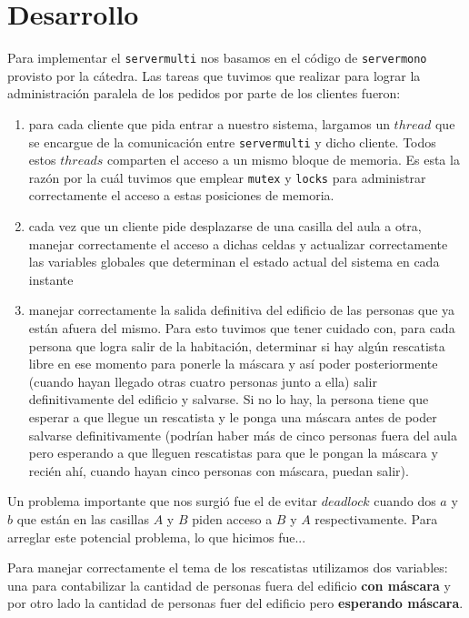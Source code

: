 \documentclass[11pt, a4paper, twoside]{article}
\begin{document}
\section{Desarrollo}
Para implementar el \texttt{servermulti} nos basamos en el código de \texttt{servermono} provisto por la
cátedra. Las tareas que tuvimos que realizar para lograr la administración paralela de los pedidos por
parte de los clientes fueron:
\begin{enumerate}
\item para cada cliente que pida entrar a nuestro sistema, largamos un $thread$ que se encargue de la
  comunicación entre \texttt{servermulti} y dicho cliente. Todos estos $threads$ comparten el acceso a un
  mismo bloque de memoria. Es esta la razón por la cuál tuvimos que emplear \texttt{mutex} y \texttt{locks}
  para administrar correctamente el acceso a estas posiciones de memoria.
\item cada vez que un cliente pide desplazarse de una casilla del aula a otra, manejar correctamente el
  acceso a dichas celdas y actualizar correctamente las variables globales que determinan el estado actual
  del sistema en cada instante
\item manejar correctamente la salida definitiva del edificio de las personas que ya están afuera del mismo.
  Para esto tuvimos que tener cuidado con,  para cada persona que logra salir de la habitación, determinar
  si hay algún rescatista libre en ese momento para ponerle la máscara y así poder posteriormente (cuando
  hayan llegado otras cuatro personas junto a ella) salir definitivamente del edificio y salvarse. Si no lo
  hay, la persona tiene que esperar a que llegue un rescatista y le ponga una máscara antes de poder salvarse
  definitivamente (podrían haber más de cinco personas fuera del aula pero esperando a que lleguen rescatistas
  para que le pongan la máscara y recién ahí, cuando hayan cinco personas con máscara, puedan salir).

\end{enumerate}

\par Un problema importante que nos surgió fue el de evitar $deadlock$ cuando dos $a$ y $b$ que están en las
casillas $A$ y $B$ piden acceso a $B$ y $A$ respectivamente. Para arreglar este potencial problema, lo que
hicimos fue...

\par Para manejar correctamente el tema de los rescatistas utilizamos dos variables: una para contabilizar
la cantidad de personas fuera del edificio \textbf{con máscara} y por otro lado la cantidad de personas
fuer del edificio pero \textbf{esperando máscara}.
\end{document}
